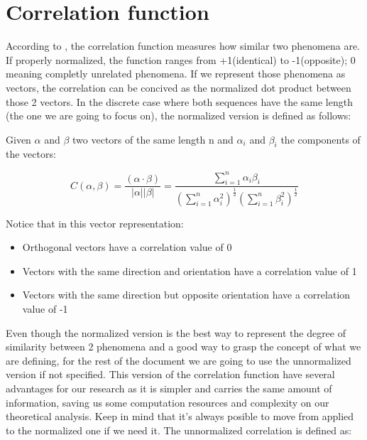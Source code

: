
\section{Correlation function}

According to \citet{golomb_ref}, the correlation function measures how similar
two phenomena are. If properly normalized, the function ranges from
+1(identical) to -1(opposite); 0 meaning completly unrelated phenomena.
If we represent those phenomena as vectors, the correlation can be concived
as the normalized dot product between those 2 vectors.
In the discrete case where both sequences have the same length (the one we are
going to focus on), the normalized version is defined as follows:

\begin{definition}\label{def:1}

Given $\alpha$ and $\beta$ two vectors of the same length n and $\alpha_{i}$
and $\beta_{i}$ the components of the vectors:

\begin{equation}\label{eq:1}
C(\alpha , \beta)=\frac{(\alpha \cdot  \beta)}{|\alpha||\beta|}=\frac{\sum_{i=1}^{n} \alpha_{i}\beta_{i}}{(\sum_{i=1}^{n} \alpha_{i}^{2})^{\frac{1}{2}}(\sum_{i=1}^{n} \beta_{i}^{2})^\frac{1}{2}}
\end{equation}
\end{definition}

Notice that in this vector
representation:
\begin{itemize}
  \item Orthogonal vectors have a correlation value of 0
  \item Vectors with the same direction and orientation have a correlation
  value of 1
  \item Vectors with the same direction but opposite orientation have a
  correlation value of -1
\end{itemize}

Even though the normalized version is the best way to represent the degree
of similarity between 2 phenomena and a good way to grasp the concept of
what we are defining, for the rest of the document we are going to use the
unnormalized version if not specified. This version of the correlation function
have several advantages for our research as it is simpler and carries the same
amount of information, saving us some computation resources and complexity on
our theoretical analysis. Keep in mind that it's always posible to move from
applied to the normalized one if we need it. The unnormalized correlation is
defined as:

